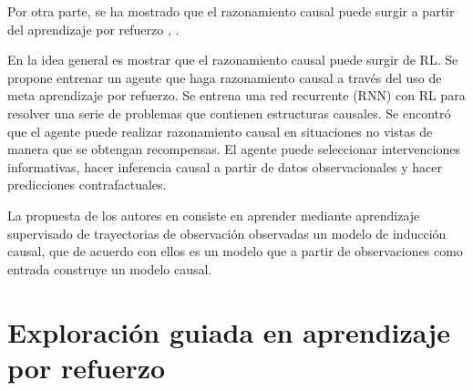 Por otra parte, se ha mostrado que el razonamiento causal puede surgir a partir del aprendizaje por refuerzo \cite{dasgupta2019causal}, \cite{madumal2019explainable} \cite{bengio2019metatransfer}.


En \cite{dasgupta2019causal} la idea general es mostrar que el razonamiento
causal puede surgir de RL. 
Se propone entrenar un agente que haga razonamiento causal a través del uso de  meta aprendizaje por refuerzo. Se entrena una red recurrente (RNN) con RL para resolver una serie de problemas que contienen estructuras causales.
Se encontró que el agente puede realizar razonamiento causal en situaciones
no vistas de manera que se obtengan recompensas. El agente
puede seleccionar intervenciones informativas, hacer inferencia causal a partir
de datos observacionales y hacer predicciones contrafactuales.



La propuesta de los autores en \cite{nair2019causal} consiste en
aprender mediante aprendizaje supervisado de trayectorias 
de observación observadas un modelo de inducción causal, que de acuerdo con ellos es un modelo que a partir
de observaciones como entrada construye un modelo causal.


\section{Exploración guiada en aprendizaje por refuerzo}

